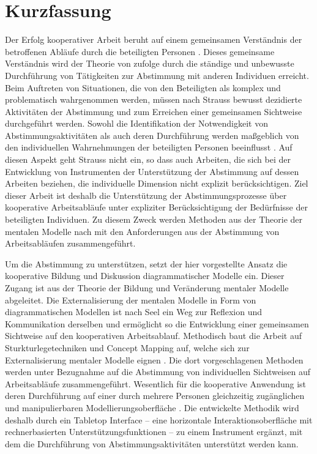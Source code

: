 
\section*{Kurzfassung}
Der Erfolg kooperativer Arbeit beruht auf einem gemeinsamen Verständnis der betroffenen Abläufe durch die beteiligten Personen \citep{Griffin92}. Dieses gemeinsame Verständnis wird der Theorie von \citet{Strauss85} zufolge durch die ständige und unbewusste Durchführung von Tätigkeiten zur Abstimmung mit anderen Individuen erreicht. Beim Auftreten von Situationen, die von den Beteiligten als komplex und problematisch wahrgenommen werden, müssen nach Strauss bewusst dezidierte Aktivitäten der Abstimmung und zum Erreichen einer gemeinsamen Sichtweise durchgeführt werden. Sowohl die Identifikation der Notwendigkeit von Abstimmungsaktivitäten als auch deren Durchführung werden maßgeblich von den individuellen Wahrnehmungen der beteiligten Personen beeinflusst \citep{Grudin88}. Auf diesen Aspekt geht Strauss nicht ein, so dass auch Arbeiten, die sich bei der Entwicklung von Instrumenten der Unterstützung der Abstimmung auf dessen Arbeiten beziehen, die individuelle Dimension nicht explizit berücksichtigen. Ziel dieser Arbeit ist deshalb die Unterstützung der Abstimmungsprozesse über kooperative Arbeitsabläufe unter expliziter Berücksichtigung der Bedürfnisse der beteiligten Individuen. Zu diesem Zweck werden Methoden aus der Theorie der mentalen Modelle nach \citet{Johnson-Laird81} mit den Anforderungen aus der Abstimmung von Arbeitsabläufen zusammengeführt.

Um die Abstimmung zu unterstützen, setzt der hier vorgestellte Ansatz die kooperative Bildung und Diskussion diagrammatischer Modelle ein. Dieser Zugang ist aus der Theorie der Bildung und Veränderung mentaler Modelle \citep{Seel91} abgeleitet. Die Externalisierung der mentalen Modelle in Form von diagrammatischen Modellen ist nach Seel ein Weg zur Reflexion und Kommunikation derselben und ermöglicht so die Entwicklung einer gemeinsamen Sichtweise auf den kooperativen Arbeitsablauf. Methodisch baut die Arbeit auf Sturkturlegetechniken und Concept Mapping auf, welche sich zur Externalisierung mentaler Modelle eignen \citep{Ifenthaler06}. Die dort vorgeschlagenen Methoden werden unter Bezugnahme auf die Abstimmung von individuellen Sichtweisen auf Arbeitsabläufe zusammengeführt. Wesentlich für die kooperative Anwendung ist deren Durchführung auf einer durch mehrere Personen gleichzeitig zugänglichen und manipulierbaren Modellierungsoberfläche \citep{Dann92}. Die entwickelte Methodik wird deshalb durch ein Tabletop Interface -- eine horizontale Interaktionsoberfläche mit rechnerbasierten Unterstützungsfunktionen -- zu einem Instrument ergänzt, mit dem die Durchführung von Abstimmungsaktivitäten unterstützt werden kann. 

